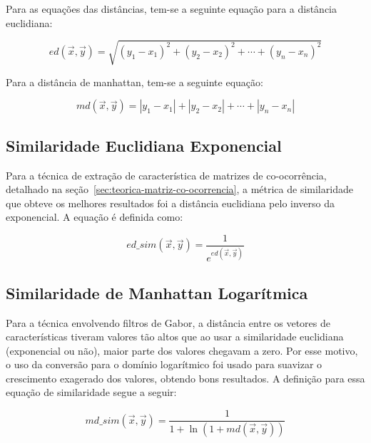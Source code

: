 Para as equações das distâncias, tem-se a seguinte equação para a
distância euclidiana:

\begin{equation}\label{eq:euclidian-distance}
ed(\vec{x}, \vec{y}) = \sqrt{{(y_1-x_1)}^2 + {(y_2-x_2)}^2 + \cdots + {(y_n-x_n)}^2}
\end{equation}

Para a distância de manhattan, tem-se a seguinte equação:

\begin{equation}\label{eq:manhattan-distance}
md(\vec{x}, \vec{y}) = |y_1-x_1| + |y_2-x_2| + \cdots + |y_n-x_n|
\end{equation}

\subsection{Similaridade Euclidiana Exponencial}\label{sec:teorica-similaridade-euclidiana}

Para a técnica de extração de característica de matrizes de co-ocorrência,
detalhado na seção~\ref{sec:teorica-matriz-co-ocorrencia}, a métrica de
similaridade que obteve os melhores resultados foi a distância
euclidiana pelo inverso da exponencial. A equação é definida como:

\begin{equation}\label{eq:euclidian-similarity}
  ed\_sim(\vec{x}, \vec{y}) = \dfrac{1}{e^{ed(\vec{x}, \vec{y})}}
\end{equation}

\subsection{Similaridade de Manhattan Logarítmica}\label{sec:teorica-similaridade-manhattan}

Para a técnica envolvendo filtros de Gabor, a distância entre os
vetores de características tiveram valores tão altos que ao usar a
similaridade euclidiana (exponencial ou não), maior parte dos valores
chegavam a zero. Por esse motivo, o uso da conversão para o domínio
logarítmico foi usado para suavizar o crescimento exagerado dos
valores, obtendo bons resultados. A definição para essa equação de
similaridade segue a seguir:

\begin{equation}\label{eq:manhattan-similarity}
  md\_sim(\vec{x}, \vec{y}) = \dfrac{1}{1 + \ln(1 + md(\vec{x}, \vec{y}))}
\end{equation}

